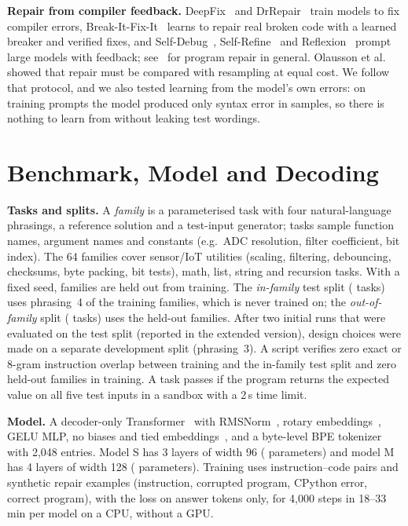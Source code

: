 \documentclass[journal]{IEEEtran}
\begin{document}
\textbf{Repair from compiler feedback.} DeepFix~\cite{gupta2017deepfix} and DrRepair~\cite{yasunaga2020drrepair} train models to fix compiler errors, Break-It-Fix-It~\cite{yasunaga2021bifi} learns to repair real broken code with a learned breaker and verified fixes, and Self-Debug~\cite{chen2024selfdebug}, Self-Refine~\cite{madaan2023selfrefine} and Reflexion~\cite{shinn2023reflexion} prompt large models with feedback; see~\cite{legoues2019apr} for program repair in general. Olausson et al.~\cite{olausson2024selfrepair} showed that repair must be compared with resampling at equal cost. We follow that protocol, and we also tested learning from the model's own errors: on training prompts the model produced only \selfrepairpairs{} syntax error in \selfrepairsamples{} samples, so there is nothing to learn from without leaking test wordings.

\section{Benchmark, Model and Decoding}
\textbf{Tasks and splits.} A \emph{family} is a parameterised task with four natural-language phrasings, a reference solution and a test-input generator; tasks sample function names, argument names and constants (e.g.\ ADC resolution, filter coefficient, bit index). The 64 families cover sensor/IoT utilities (scaling, filtering, debouncing, checksums, byte packing, bit tests), math, list, string and recursion tasks. With a fixed seed, \nfamheld{} families are held out from training. The \emph{in-family} test split (\ntestid{} tasks) uses phrasing~4 of the training families, which is never trained on; the \emph{out-of-family} split (\ntestood{} tasks) uses the held-out families. After two initial runs that were evaluated on the test split (reported in the extended version), design choices were made on a separate development split (phrasing~3). A script verifies zero exact or 8-gram instruction overlap between training and the in-family test split and zero held-out families in training. A task passes if the program returns the expected value on all five test inputs in a sandbox with a 2\,s time limit.

\textbf{Model.} A decoder-only Transformer~\cite{vaswani2017attention} with RMSNorm~\cite{zhang2019rmsnorm}, rotary embeddings~\cite{su2024roformer}, GELU MLP, no biases and tied embeddings~\cite{press2017tying}, and a byte-level BPE tokenizer~\cite{sennrich2016bpe} with 2{,}048 entries. Model S has 3 layers of width 96 (\dsmparams{} parameters) and model M has 4 layers of width 128 (\depparams{} parameters). Training uses \ntraingen{} instruction--code pairs and \ntrainrepair{} synthetic repair examples (instruction, corrupted program, CPython error, correct program), with the loss on answer tokens only, for 4{,}000 steps in 18--33\,min per model on a CPU, without a GPU.
\end{document}
